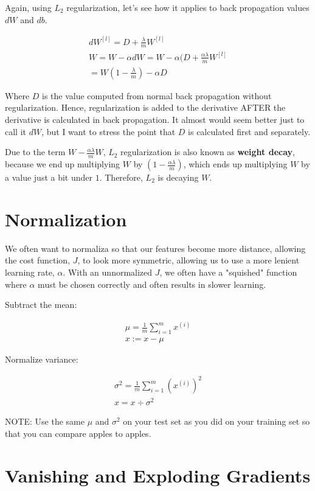 \documentclass{article}
\begin{document}
Again, using $L_2$ regularization, let's see how it applies to back propagation values $dW$ and $db$.

\begin{gather}
dW^{[l]} = D + \frac{\lambda}{m} W^{[l]} \\
W = W - \alpha dW = W - \alpha (D + \frac{\alpha \lambda}{m} W^{[l]} \\
= W(1 - \frac{\lambda}{m}) - \alpha D
\end{gather}

Where $D$ is the value computed from normal back propagation without regularization.  Hence, regularization is added to the derivative AFTER the derivative is calculated in back propagation.  It almost would seem better just to call it $dW$, but I want to stress the point that $D$ is calculated first and separately.

Due to the term $W - \frac{\alpha\lambda}{m} W$, $L_2$ regularization is also known as \textbf{weight decay}, because we end up multiplying $W$ by $(1 - \frac{\alpha\lambda}{m})$, which ends up multiplying $W$ by a value just a bit under $1$.  Therefore, $L_2$ is decaying $W$.

\section{Normalization}

We often want to normaliza so that our features become more distance, allowing the cost function, $J$, to look more symmetric, allowing us to use a more lenient learning rate, $\alpha$.  With an unnormalized $J$, we often have a "squished" function where $\alpha$ must be chosen correctly and often results in slower learning.

Subtract the mean:

\begin{gather}
\mu = \frac{1}{m} \sum_{i=1}^{m} x^{(i)} \\
x := x - \mu
\end{gather}


Normalize variance:

\begin{gather}
\sigma^2 = \frac{1}{m} \sum_{i=1}^{m} (x^{(i)})^2 \\
x = x \div \sigma^2
\end{gather}

NOTE: Use the same $\mu$ and $\sigma^2$ on your test set as you did on your training set so that you can compare apples to apples.

\section{Vanishing and Exploding Gradients}
\end{document}
